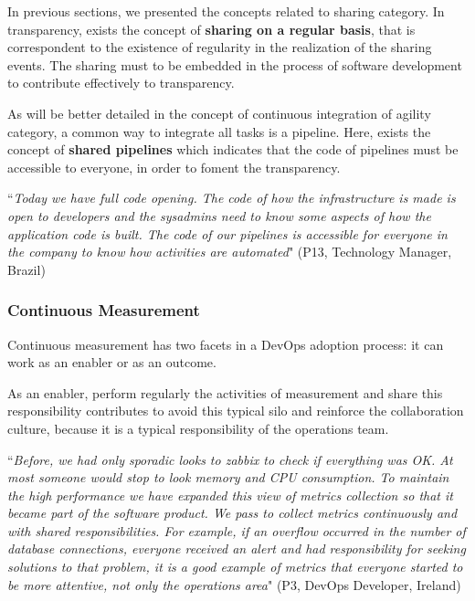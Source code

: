 In previous sections, we presented the concepts related to sharing category. In
transparency, exists the concept of \textbf{sharing on a regular basis}, that
is correspondent to the existence of regularity in the realization of the
sharing events. The sharing must to be embedded in the process of software
development to contribute effectively to transparency.

As will be better detailed in the concept of continuous integration of agility
category, a common way to integrate all tasks is a pipeline. Here, exists the
concept of \textbf{shared pipelines} which indicates that the code of pipelines
must be accessible to everyone, in order to foment the transparency.

\begin{mq}
``\emph{Today we have full code opening. The code of how the infrastructure is
made is open to developers and the sysadmins need to know some aspects of how 
the application code is built. The code of our pipelines is accessible for
everyone in the company to know how activities are automated}" (P13, Technology
Manager, Brazil)
\end{mq}


\subsubsection{Continuous Measurement}

Continuous measurement has two facets in a DevOps adoption process: it can work
as an enabler or as an outcome.

As an enabler, perform regularly the activities of measurement and share this
responsibility contributes to avoid this typical silo and reinforce the
collaboration culture, because it is a typical responsibility of the operations
team.

\begin{mq}
``\emph{Before, we had only sporadic looks to zabbix to check if everything was OK.
At most someone would stop to look memory and CPU consumption. To maintain the
high performance we have expanded this view of metrics collection so that it
became part of the software product. We pass to collect metrics continuously
and with shared responsibilities. For example, if an overflow occurred in the
number of database connections, everyone received an alert and had
responsibility for seeking solutions to that problem, it is a good example of
metrics that everyone started to be more attentive, not only the operations
area}" (P3, DevOps Developer, Ireland)
\end{mq}

